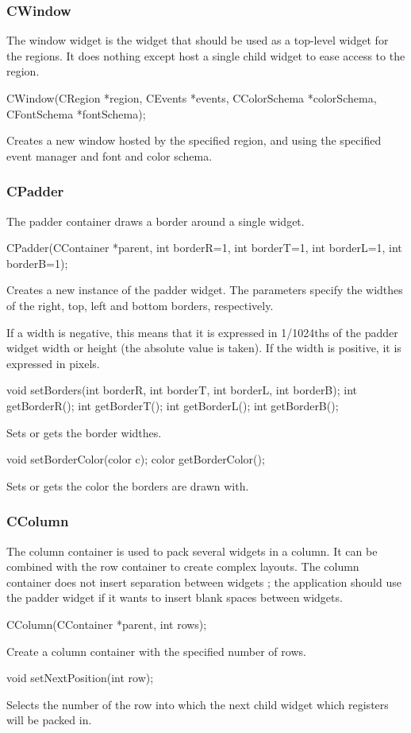 \documentclass[a4paper,11pt]{journal}
\begin{document}
\subsubsection{CWindow}
The window widget is the widget that should be used as a top-level widget for the regions. It does nothing except host a single child widget to ease access to the region.\\
\begin{verbatimtab}CWindow(CRegion *region, CEvents *events, CColorSchema *colorSchema,
CFontSchema *fontSchema);\end{verbatimtab}
Creates a new window hosted by the specified region, and using the specified event manager and font and color schema.\\
\subsubsection{CPadder}
The padder container draws a border around a single widget.\\
\begin{verbatimtab}CPadder(CContainer *parent, int borderR=1, int borderT=1, int borderL=1,
int borderB=1);\end{verbatimtab}
Creates a new instance of the padder widget. The parameters specify the widthes of the right, top, left and bottom borders, respectively.

If a width is negative, this means that it is expressed in 1/1024ths of the padder widget width or height (the absolute value is taken). If the width is positive, it is expressed in pixels.\\
\begin{verbatimtab}
void setBorders(int borderR, int borderT, int borderL, int borderB);
int getBorderR();
int getBorderT();
int getBorderL();
int getBorderB();
\end{verbatimtab}
Sets or gets the border widthes.\\
\begin{verbatimtab}void setBorderColor(color c);
color getBorderColor();\end{verbatimtab}
Sets or gets the color the borders are drawn with.

\subsubsection{CColumn}
The column container is used to pack several widgets in a column. It can be combined with the row container to create complex layouts. The column container does not insert separation between widgets ; the application should use the padder widget if it wants to insert blank spaces between widgets.\\
\begin{verbatimtab}CColumn(CContainer *parent, int rows);\end{verbatimtab}
Create a column container with the specified number of rows.\\
\begin{verbatimtab}void setNextPosition(int row);\end{verbatimtab}
Selects the number of the row into which the next child widget which registers will be packed in.
\end{document}
